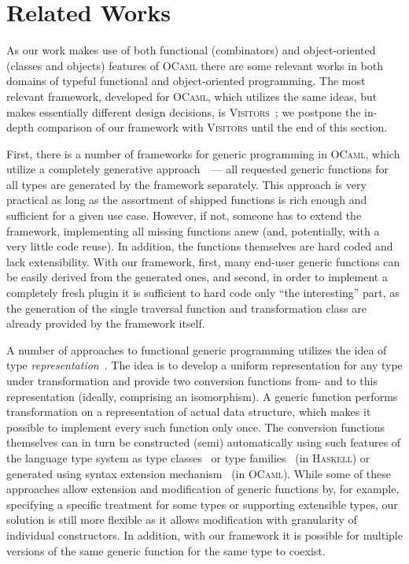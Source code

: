 \section{Related Works}

As our work makes use of both functional (combinators) and object-oriented (classes and objects) features of \textsc{OCaml} there are some relevant works
in both domains of typeful functional and object-oriented programming. The most relevant framework, developed for \textsc{OCaml}, which utilizes the same
ideas, but makes essentially different design decisions, is \textsc{Visitors}~\cite{Visitors}; we postpone the in-depth comparison of our framework with
\textsc{Visitors} until the end of this section.

First, there is a number of frameworks for generic programming in \textsc{OCaml}, which utilize a completely generative approach~\cite{Yallop,PPXDeriving}~---
all requested generic functions for all types are generated by the framework separately. This approach is very practical as long as the assortment
of shipped functions is rich enough and sufficient for a given use case. However, if not, someone has to extend the framework, implementing
all missing functions anew (and, potentially, with a very little code reuse). In addition, the functions themselves are hard coded and
lack extensibility. With our framework, first, many end-user generic functions can be easily derived from the generated ones, and second, in order to
implement a completely fresh plugin it is sufficient to hard code only ``the interesting'' part, as the generation of the single traversal
function and transformation class are already provided by the framework itself.

A number of approaches to functional generic programming utilizes the idea of type \emph{representation}~\cite{Hinze}.
The idea is to develop a uniform representation for any type under transformation and provide two conversion functions from- and to this representation
(ideally, comprising an isomorphism). A generic function performs transformation on a representation of actual data structure, which makes it possible to
implement every such function only once. The conversion functions themselves can in turn be constructed (semi) automatically using such features of
the language type system as type classes~\cite{Hinze,ALaCarte} or type families~\cite{InstantGenerics} (in \textsc{Haskell}) or generated using syntax extension
mechanism~\cite{GenericOCaml} (in \textsc{OCaml}). While some of these approaches allow extension and modification of generic functions by, for example, specifying a
specific treatment for some types or supporting extensible types, our solution is still more flexible as it allows modification with granularity of individual
constructors. In addition, with our framework it is possible for multiple versions of the same generic function for the same type to coexist.

